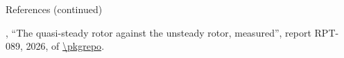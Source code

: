 \documentclass[aspectratio=169,11pt]{beamer}
\begin{document}
\begin{frame}{References (continued)}
\begin{reflist}
  \setcounter{enumi}{17}
   \smiref
  \setcounter{enumi}{19}
   \pkgauthor, ``The quasi-steady rotor against the unsteady rotor,
        measured'', report RPT-089, 2026,  of \url{\pkgrepo}.
   
   
\end{reflist}
\end{frame}
\end{document}
